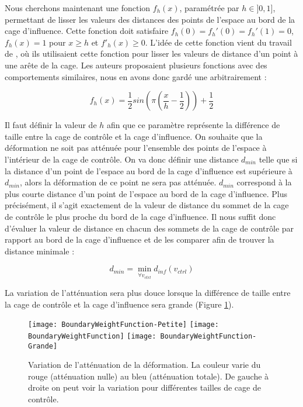 Nous cherchons maintenant une fonction $f_h(x)$, paramétrée par $h \in ]0,
1]$, permettant de lisser les valeurs des distances des points de l'espace au
bord de la cage d'influence. Cette fonction doit satisfaire $f_h(0) = f_h'(0)
= f_h'(1) = 0$, $f_h(x)=1$ pour $x \geq h$ et $f'_h(x) \geq 0$. L'idée de
cette fonction vient du travail de \cite{GPCP13}, où ils utilisaient cette
fonction pour lisser les valeurs de distance d'un point à une arête de la
cage. Les auteurs proposaient plusieurs fonctions avec des comportements
similaires, nous en avons donc gardé une arbitrairement :

\begin{equation}
  f_h(x) = \frac{1}{2} sin(\pi(\frac{x}{h} - \frac{1}{2})) + \frac{1}{2}
\end{equation}

Il faut définir la valeur de $h$ afin que ce paramètre représente la
différence de taille entre la cage de contrôle et la cage d'influence. On
souhaite que la déformation ne soit pas atténuée pour l'ensemble des points de
l'espace à l'intérieur de la cage de contrôle. On va donc définir une distance
$d_{min}$ telle que si la distance d'un point de l'espace au bord de la cage
d'influence est supérieure à $d_{min}$, alors la déformation de ce point ne
sera pas atténuée. $d_{min}$ correspond à la plus courte distance d'un point
de l'espace au bord de la cage d'influence. Plus précisément, il s'agit
exactement de la valeur de distance du sommet de la cage de contrôle le plus
proche du bord de la cage d'influence. Il nous suffit donc d'évaluer la valeur
de distance en chacun des sommets de la cage de contrôle par rapport au bord
de la cage d'influence et de les comparer afin de trouver la distance
minimale :

\begin{equation}
  d_{min} = \min_{\forall v_{ctrl}} d_{inf}(v_{ctrl})
\end{equation}

La variation de l'atténuation sera plus douce lorsque la différence de taille
entre la cage de contrôle et la cage d'influence sera grande (Figure
\ref{MELBou}).

\begin{figure}[ht]
  \begin{center}
    \texttt{[image: BoundaryWeightFunction-Petite]}
    \texttt{[image: BoundaryWeightFunction]}
    \texttt{[image: BoundaryWeightFunction-Grande]}

    \caption{Variation de l'atténuation de la déformation. La couleur varie du
rouge (atténuation nulle) au bleu (atténuation totale). De gauche à droite on
peut voir la variation pour différentes tailles de cage de contrôle.}

    \label{MELBou}
  \end{center}
\end{figure}

